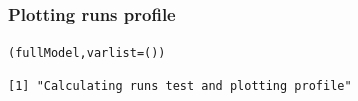\vspace{1cm}

\begin{frame}[fragile]
\frametitle{Plotting runs profile}
\begin{knitrout}\footnotesize
{}\color{fgcolor}\begin{kframe}
\begin{alltt}
(fullModel,  varlist = ())
\end{alltt}
\begin{verbatim}
[1] "Calculating runs test and plotting profile"
\end{verbatim}
\end{kframe}
\end{knitrout}


\end{frame}
